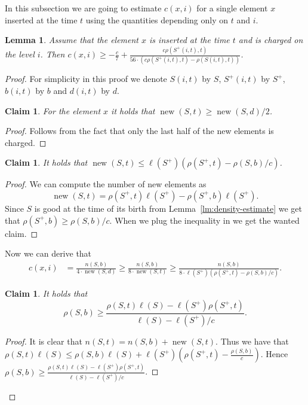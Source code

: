 \documentclass[11pt]{article} %
\newcommand{\density}[2]{\rho(#1, #2)}
\newcommand{\length}[1]{\ell(#1)}
\newcommand{\charge}[2]{c(#1, #2)}
\newcommand{\new}[2]{\operatorname{new}(#1, #2)}
\newcommand{\scount}[2]{n(#1, #2)}
\newcommand{\segment}[2]{S(#1, #2)}
\newcommand{\segmentt}[2]{S^+(#1, #2)}
\newtheorem{lemma}[definition]{Lemma}
\newtheorem{claim}[definition]{Claim}
\begin{document}
In this subsection we are going to estimate $\charge{x}{i}$ for a single element $x$ inserted at the time $t$ using the quantities depending only on $t$ and $i$.
\begin{lemma}
\label{lm:charge-estimate}
Assume that the element $x$ is inserted at the time $t$ and is charged on the level $i$.
Then $\charge{x}{i} \geq -\frac{c}{7} + \frac{c \density{\segmentt{i}{t}}{t}}{56 \cdot \left(c\density{\segmentt{i}{t}}{t} - \density{\segment{i}{t}}{t}\right)}$.
\end{lemma}
\begin{proof}
For simplicity in this proof we denote $\segment{i}{t}$ by $S$, $\segmentt{i}{t}$ by $S^+$, $b(i, t)$ by $b$ and $d(i, t)$ by $d$.
\begin{claim}
For the element $x$ it holds that $\new{S}{t} \geq \new{S}{d} / 2$.
\end{claim}
\begin{proof}
Follows from the fact that only the last half of the new elements is charged.
\end{proof}

\begin{claim}
It holds that $\new{S}{t} \leq \length{S^+}(\density{S^+}{t} - \density{S}{b}/c)$.
\end{claim}
\begin{proof}
We can compute the number of new elements as 
\[
	\new{S}{t} = \density{S^+}{t}\length{S^+} - \density{S^+}{b}\length{S^+}.
\]
Since $S$ is good at the time of its birth from Lemma~\ref{lm:density-estimate} we get that $\density{S^+}{b} \geq \density{S}{b}/c$. 
When we plug the inequality in we get the wanted claim.
\end{proof}

Now we can derive that
\[
\begin{split}
\charge{x}{i} 
	& = \frac{\scount{S}{b}}{4 \cdot \new{S}{d}}
	\geq \frac{\scount{S}{b}}{8 \cdot \new{S}{t}}
	\geq \frac{\scount{S}{b}}{8 \cdot \length{S^+}(\density{S^+}{t} - \density{S}{b}/c)}.
\end{split}
\]

\begin{claim}
It holds that
\[\density{S}{b} \geq \frac{\density{S}{t}\length{S} - \length{S^+}\density{S^+}{t}}{\length{S} - \length{S^+}/c}.\]
\end{claim}
\begin{proof}
It is clear that $\scount{S}{t} = \scount{S}{b} + \new{S}{t}$.
Thus we have that $\density{S}{t}\length{S} \leq \density{S}{b}\length{S} + \length{S^+}\left(\density{S^+}{t} - \frac{\density{S}{b}}{c}\right)$.
Hence $\density{S}{b} \geq \frac{\density{S}{t}\length{S} - \length{S^+}\density{S^+}{t}}{\length{S} - \length{S^+}/c}$.
\end{proof}


\end{proof}
\end{document}
